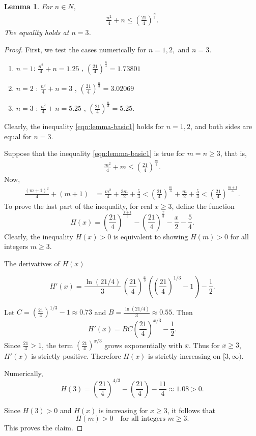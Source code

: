 \documentclass[a4paper,11pt,reqno]{amsart}
\newtheorem{lemma}{Lemma}
\begin{document}
\begin{lemma}\label{lemma-basic1}
    For $ n \in N$, 
    \begin{align}\label{eqn:lemma-basic1}
    \frac{n^2}{4}+n\le \left(\frac{21}{4}\right)^{\frac{n}{3}}.
    \end{align}
    The equality holds at $n=3$.
\end{lemma}
\begin{proof}
First, we test the cases numerically for $n=1, 2,$ and $n=3$.
\begin{enumerate}
\item $n=1$: $\frac{n^2}{4}+n= 1.25$ , $\left(\frac{21}{4}\right)^{\frac{n}{3}}= 1.73801$
\item  $n=2$ : $\frac{n^2}{4}+n= 3$ , $\left(\frac{21}{4}\right)^{\frac{n}{3}}= 3.02069$
\item  $n=3$ : $\frac{n^2}{4}+n= 5.25$ , $\left(\frac{21}{4}\right)^{\frac{n}{3}}= 5.25$. 
\end{enumerate}
Clearly, the inequality \eqref{eqn:lemma-basic1} holds for $n=1, 2$,  and both sides are equal for $n=3$. 

Suppose that the inequality \eqref{eqn:lemma-basic1} is true for $m=n \ge 3$, that is, 
\begin{align*}
    \frac{m^2}{4}+m\le \left(\frac{21}{4}\right)^{\frac{m}{3}}.
\end{align*}
Now,
\begin{align*}
    \frac{(m+1)^2}{4}+(m+1)&=\frac{m^2}{4}+ \frac{3 m}{2} +\frac{5}{4}<\left(\frac{21}{4}\right)^{\frac{m}{3}}+\frac{ m}{2}+\frac{5}{4}<\left(\frac{21}{4}\right)^{\frac{m+1}{3}}.
\end{align*}
To prove the last part of the inequality, for real $x \geq 3$, define the function
\[
H(x) = \left(\frac{21}{4}\right)^{\tfrac{x+1}{3}} - \left(\frac{21}{4}\right)^{\tfrac{x}{3}} - \frac{x}{2} - \frac{5}{4}.
\]
Clearly, the inequality $H(x) >0$ is equivalent to showing $H(m) > 0$ for all integers $m \geq 3$.

\medskip
The derivatives of $H(x)$

\[
H'(x) = \frac{\ln(21/4)}{3}\,\left(\frac{21}{4}\right)^{\tfrac{x}{3}}
\left(\left(\frac{21}{4}\right)^{1/3}-1\right) - \frac{1}{2}.
\]

\medskip

Let $C = \left(\tfrac{21}{4}\right)^{1/3} - 1 \approx 0.73$ and 
$B = \tfrac{\ln(21/4)}{3} \approx 0.55$. Then
\[
H'(x) = BC \left(\frac{21}{4}\right)^{x/3} - \frac{1}{2}.
\]
Since $\tfrac{21}{4} > 1$, the term $\left(\tfrac{21}{4}\right)^{x/3}$ grows exponentially with $x$. 
Thus for $x \geq 3$, $H'(x)$ is strictly positive. Therefore $H(x)$ is strictly increasing on $[3,\infty)$.

\medskip

Numerically,
\[
H(3) = \left(\frac{21}{4}\right)^{4/3} - \left(\frac{21}{4}\right) - \frac{11}{4} \approx 1.08 > 0.
\]


\medskip

Since $H(3) > 0$ and $H(x)$ is increasing for $x \geq 3$, it follows that
\[
H(m) > 0 \quad \text{for all integers } m \geq 3.
\]
This proves the claim. 
\end{proof}
\end{document}
